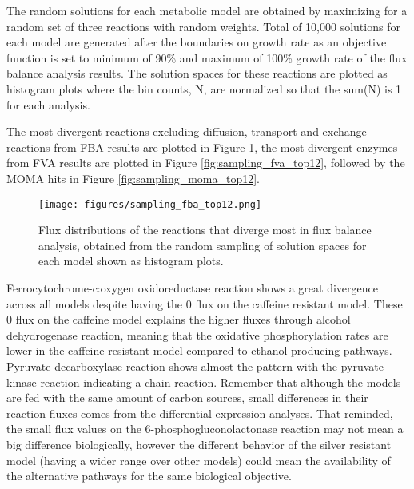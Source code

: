 The random solutions for each metabolic model are obtained by maximizing for a random set of three reactions with random weights. Total of 10,000 solutions for each model are generated after the boundaries on growth rate as an objective function is set to minimum of 90\% and maximum of 100\% growth rate of the flux balance analysis results. The solution spaces for these reactions are plotted as histogram plots where the bin counts, N, are normalized so that the sum(N) is 1 for each analysis.

The most divergent reactions excluding diffusion, transport and exchange reactions from FBA results are plotted in Figure \ref{fig:sampling_fba_top12}, the most divergent enzymes from FVA results are plotted in Figure \ref{fig:sampling_fva_top12}, followed by the MOMA hits in Figure \ref{fig:sampling_moma_top12}.

\begin{figure}[H]
  \begin{center}
  \texttt{[image: figures/sampling\_fba\_top12.png]}
  \caption[Flux distributions of the reactions that diverge most in flux balance analysis, obtained from the random sampling of solution spaces for each model shown as histogram plots]{Flux distributions of the reactions that diverge most in flux balance analysis, obtained from the random sampling of solution spaces for each model shown as histogram plots.}
  \label{fig:sampling_fba_top12}
  \end{center}
\end{figure}

Ferrocytochrome-c:oxygen oxidoreductase reaction shows a great divergence across all models despite having the 0 flux on the caffeine resistant model. These 0 flux on the caffeine model explains the higher fluxes through alcohol dehydrogenase reaction, meaning that the oxidative phosphorylation rates are lower in the caffeine resistant model compared to ethanol producing pathways. Pyruvate decarboxylase reaction shows almost the pattern with the pyruvate kinase reaction indicating a chain reaction. Remember that although the models are fed with the same amount of carbon sources, small differences in their reaction fluxes comes from the differential expression analyses. That reminded, the small flux values on the 6-phosphogluconolactonase reaction may not mean a big difference biologically, however the different behavior of the silver resistant model (having a wider range over other models) could mean the availability of the alternative pathways for the same biological objective.


